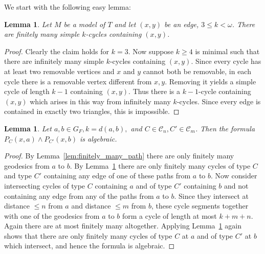 \documentclass{amsart}
\newcommand{\C}{\mathcal{C}}
\newtheorem{lemma}[defi]{Lemma}
\begin{document}
We start with the following easy lemma:

\begin{lemma}\label{lem:finitely many cycles}
Let $M$ be a model of $T$ and let $(x,y)$ be an edge, $3\leq k<\omega$. There are finitely many simple $k$-cycles  containing $(x,y)$.
\end{lemma}
\begin{proof}
Clearly the claim holds for $k=3$.
Now suppose $k\geq 4$ is minimal such that there are infinitely many simple $k$-cycles  containing $(x,y)$. Since every cycle has at least two removable vertices and $x$ and $y$ cannot both be removable, in each cycle there is a removable vertex different from $x, y$. Removing it yields a simple cycle of length $k-1$ containing $(x,y)$. Thus there is a $k-1$-cycle containing $(x,y)$ which arises in this way from infinitely many $k$-cycles. Since every edge is contained in exactly two triangles, this is impossible.
\end{proof}

\begin{lemma}\label{lem:str min}
Let $a,b\in G_F, k=d(a,b),$ and $C\in \C_n, C'\in\C_m$. Then the formula $P_C(x,a)\wedge P_{C'}(x,b)$ is algebraic.
\end{lemma}
\begin{proof}
By Lemma~\ref{lem:finitely_many_path} there are only finitely many geodesics from $a$ to $b$. By Lemma~\ref{lem:finitely many cycles} there are only finitely many cycles of type $C$ and type $C'$ containing any edge of one of these paths from $a$ to $b$. Now consider intersecting cycles of type $C$ containing $a$ and of type $C'$ containing $b$ and not containing any edge from any of the paths from $a$ to $b$. Since they intersect at distance $\leq n$ from $a$ and distance $\leq m$ from $b$, these cycle segments together with one of the geodesics from $a$ to $b$ form a cycle of length at most $k+m+n$. Again there are at most finitely many altogether. Applying Lemma~\ref{lem:finitely many cycles} again shows that there are only finitely many cycles of type $C$ at $a$ and of type $C'$ at $b$ which intersect, and hence the formula is algebraic.

\end{proof}
\end{document}
